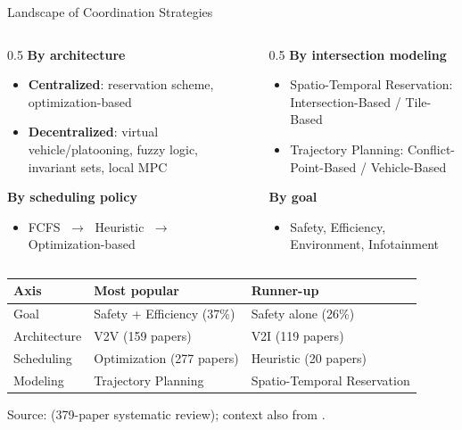 \documentclass[aspectratio=169,10pt]{beamer}
\begin{document}
\begin{frame}{Landscape of Coordination Strategies}
    \small
    \begin{columns}[T]
        \begin{column}{0.5\textwidth}
            \textbf{By architecture}
            \begin{itemize}
                \item \textbf{Centralized}: reservation scheme, optimization-based
                \item \textbf{Decentralized}: virtual vehicle/platooning, fuzzy logic, invariant sets, local MPC
            \end{itemize}
            \textbf{By scheduling policy}
            \begin{itemize}
                \item FCFS $\;\to\;$ Heuristic $\;\to\;$ Optimization-based
            \end{itemize}
        \end{column}
        \begin{column}{0.5\textwidth}
            \textbf{By intersection modeling}
            \begin{itemize}
                \item Spatio-Temporal Reservation: Intersection-Based / Tile-Based
                \item Trajectory Planning: Conflict-Point-Based / Vehicle-Based
            \end{itemize}
            \textbf{By goal}
            \begin{itemize}
                \item Safety, Efficiency, Environment, Infotainment
            \end{itemize}
        \end{column}
    \end{columns}
    \vspace{6pt}
    \begin{center}
    \footnotesize
    \begin{tabular}{lll}
        \toprule
        \textbf{Axis} & \textbf{Most popular} & \textbf{Runner-up} \\
        \midrule
        Goal & Safety + Efficiency (37\%) & Safety alone (26\%) \\
        Architecture & V2V (159 papers) & V2I (119 papers) \\
        Scheduling & Optimization (277 papers) & Heuristic (20 papers) \\
        Modeling & Trajectory Planning & Spatio-Temporal Reservation \\
        \bottomrule
    \end{tabular}
    \end{center}
    \tiny Source: \cite{gholamhosseinian2022survey} (379-paper systematic review); context also from \cite{riostorres2017survey, zhong2021survey}.
\end{frame}
\end{document}
